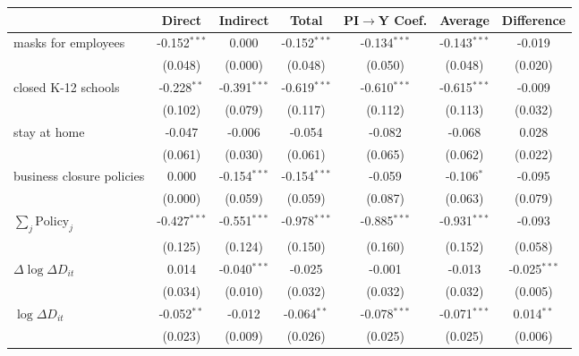 
\begin{tabular}{lccccc|>{}c}
\toprule
  & Direct & Indirect & Total & PI$\to$Y Coef. & Average & Difference\\
\midrule
masks for employees & -0.152$^{***}$ & 0.000 & -0.152$^{***}$ & -0.134$^{***}$ & -0.143$^{***}$ & -0.019\\
 & (0.048) & (0.000) & (0.048) & (0.050) & (0.048) & (0.020)\\
closed K-12 schools & -0.228$^{**}$ & -0.391$^{***}$ & -0.619$^{***}$ & -0.610$^{***}$ & -0.615$^{***}$ & -0.009\\
 & (0.102) & (0.079) & (0.117) & (0.112) & (0.113) & (0.032)\\
stay at home & -0.047 & -0.006 & -0.054 & -0.082 & -0.068 & 0.028\\
 & (0.061) & (0.030) & (0.061) & (0.065) & (0.062) & (0.022)\\
business closure policies & 0.000 & -0.154$^{***}$ & -0.154$^{***}$ & -0.059 & -0.106$^{*}$ & -0.095\\
 & (0.000) & (0.059) & (0.059) & (0.087) & (0.063) & (0.079)\\
$\sum_j \mathrm{Policy}_j$ & -0.427$^{***}$ & -0.551$^{***}$ & -0.978$^{***}$ & -0.885$^{***}$ & -0.931$^{***}$ & -0.093\\
 & (0.125) & (0.124) & (0.150) & (0.160) & (0.152) & (0.058)\\
$\Delta \log \Delta D_{it}$ & 0.014 & -0.040$^{***}$ & -0.025 & -0.001 & -0.013 & -0.025$^{***}$\\
 & (0.034) & (0.010) & (0.032) & (0.032) & (0.032) & (0.005)\\
$\log \Delta D_{it}$ & -0.052$^{**}$ & -0.012 & -0.064$^{**}$ & -0.078$^{***}$ & -0.071$^{***}$ & 0.014$^{**}$\\
 & (0.023) & (0.009) & (0.026) & (0.025) & (0.025) & (0.006)\\
\bottomrule
\end{tabular}